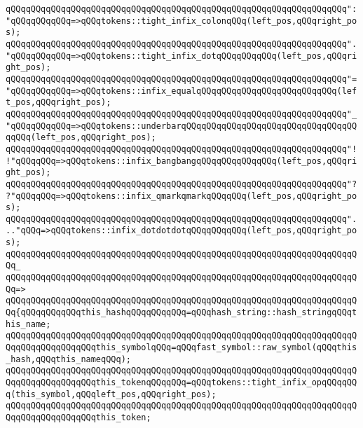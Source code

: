 \newline
\verb|qQQqqQQqqQQqqQQqqQQqqQQqqQQqqQQqqQQqqQQqqQQqqQQqqQQqqQQqqQQqqQQqqQQq":"qQQqqQQqqQQq=>qQQqtokens::tight_infix_colonqQQq(left_pos,qQQqright_pos);|\newline
\verb|qQQqqQQqqQQqqQQqqQQqqQQqqQQqqQQqqQQqqQQqqQQqqQQqqQQqqQQqqQQqqQQqqQQq"."qQQqqQQqqQQq=>qQQqtokens::tight_infix_dotqQQqqQQqqQQq(left_pos,qQQqright_pos);|\newline
\verb|qQQqqQQqqQQqqQQqqQQqqQQqqQQqqQQqqQQqqQQqqQQqqQQqqQQqqQQqqQQqqQQqqQQq"="qQQqqQQqqQQq=>qQQqtokens::infix_equalqQQqqQQqqQQqqQQqqQQqqQQqqQQq(left_pos,qQQqright_pos);|\newline
\verb|qQQqqQQqqQQqqQQqqQQqqQQqqQQqqQQqqQQqqQQqqQQqqQQqqQQqqQQqqQQqqQQqqQQq"_"qQQqqQQqqQQq=>qQQqtokens::underbarqQQqqQQqqQQqqQQqqQQqqQQqqQQqqQQqqQQqqQQq(left_pos,qQQqright_pos);|\newline
\verb|qQQqqQQqqQQqqQQqqQQqqQQqqQQqqQQqqQQqqQQqqQQqqQQqqQQqqQQqqQQqqQQqqQQq"!!"qQQqqQQq=>qQQqtokens::infix_bangbangqQQqqQQqqQQqqQQq(left_pos,qQQqright_pos);|\newline
\verb|qQQqqQQqqQQqqQQqqQQqqQQqqQQqqQQqqQQqqQQqqQQqqQQqqQQqqQQqqQQqqQQqqQQq"??"qQQqqQQq=>qQQqtokens::infix_qmarkqmarkqQQqqQQq(left_pos,qQQqright_pos);|\newline
\verb|qQQqqQQqqQQqqQQqqQQqqQQqqQQqqQQqqQQqqQQqqQQqqQQqqQQqqQQqqQQqqQQqqQQq"..."qQQq=>qQQqtokens::infix_dotdotdotqQQqqQQqqQQq(left_pos,qQQqright_pos);|\newline
\verb|qQQqqQQqqQQqqQQqqQQqqQQqqQQqqQQqqQQqqQQqqQQqqQQqqQQqqQQqqQQqqQQqqQQqqQQq_|\newline
\verb|qQQqqQQqqQQqqQQqqQQqqQQqqQQqqQQqqQQqqQQqqQQqqQQqqQQqqQQqqQQqqQQqqQQqqQQq=>|\newline
\verb|qQQqqQQqqQQqqQQqqQQqqQQqqQQqqQQqqQQqqQQqqQQqqQQqqQQqqQQqqQQqqQQqqQQqqQQq{qQQqqQQqqQQqthis_hashqQQqqQQqqQQq=qQQqhash_string::hash_stringqQQqthis_name;|\newline
\verb|qQQqqQQqqQQqqQQqqQQqqQQqqQQqqQQqqQQqqQQqqQQqqQQqqQQqqQQqqQQqqQQqqQQqqQQqqQQqqQQqqQQqqQQqthis_symbolqQQq=qQQqfast_symbol::raw_symbol(qQQqthis_hash,qQQqthis_nameqQQq);|\newline
\verb|qQQqqQQqqQQqqQQqqQQqqQQqqQQqqQQqqQQqqQQqqQQqqQQqqQQqqQQqqQQqqQQqqQQqqQQqqQQqqQQqqQQqqQQqthis_tokenqQQqqQQq=qQQqtokens::tight_infix_opqQQqqQQq(this_symbol,qQQqleft_pos,qQQqright_pos);|\newline
\newline
\verb|qQQqqQQqqQQqqQQqqQQqqQQqqQQqqQQqqQQqqQQqqQQqqQQqqQQqqQQqqQQqqQQqqQQqqQQqqQQqqQQqqQQqqQQqthis_token;|\newline
